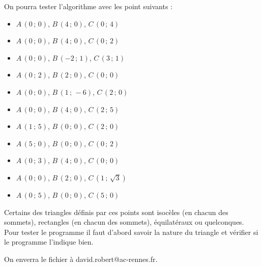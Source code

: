\medskip

On pourra tester l'algorithme avec les point suivants :
\begin{itemize}
 \item $A\,(0\,;\,0)$, $B\,(4\,;\,0)$, $C\,(0\,;\,4)$
  \item $A\,(0\,;\,0)$, $B\,(4\,;\,0)$, $C\,(0\,;\,2)$
 \item $A\,(0\,;\,0)$, $B\,(-2\,;\,1)$, $C\,(3\,;\,1)$
 \item $A\,(0\,;\,2)$, $B\,(2\,;\,0)$, $C\,(0\,;\,0)$
 \item $A\,(0\,;\,0)$, $B\,(1\,;\,-6)$, $C\,(2\,;\,0)$ 
 \item $A\,(0\,;\,0)$, $B\,(4\,;\,0)$, $C\,(2\,;\,5)$
 \item $A\,(1\,;\,5)$, $B\,(0\,;\,0)$, $C\,(2\,;\,0)$
 \item $A\,(5\,;\,0)$, $B\,(0\,;\,0)$, $C\,(0\,;\,2)$
 \item $A\,(0\,;\,3)$, $B\,(4\,;\,0)$, $C\,(0\,;\,0)$
\item $A\,(0\,;\,0)$, $B\,(2\,;\,0)$, $C\,(1\,;\,\sqrt{3})$
 \item $A\,(0\,;\,5)$, $B\,(0\,;\,0)$, $C\,(5\,;\,0)$
\end{itemize}

\medskip

Certains des triangles d\'efinis par ces points sont isoc\`eles (en chacun des sommets), rectangles (en chacun des sommets), \'equilat\'eraux ou quelconques. Pour tester le programme il faut d'abord savoir la nature du triangle et v\'erifier si le programme l'indique bien.

\medskip

On enverra le fichier \`a david.robert@ac-rennes.fr.


\setcounter{chapter}{\thechaptertemp} %

